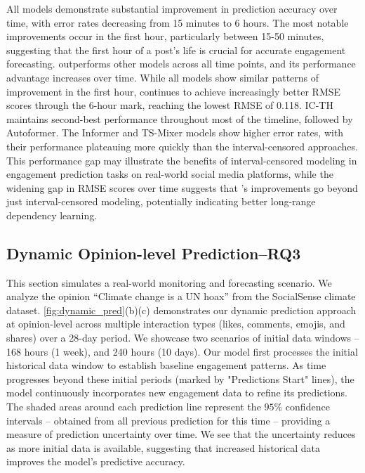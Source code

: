 All models demonstrate substantial improvement in prediction accuracy over time, with error rates decreasing from 15 minutes to 6 hours. The most notable improvements occur in the first hour, particularly between 15-50 minutes, suggesting that the first hour of a post's life is crucial for accurate engagement forecasting.
\icmamba outperforms other models across all time points, and its performance advantage increases over time. While all models show similar patterns of improvement in the first hour, \icmamba continues to achieve increasingly better RMSE scores through the 6-hour mark, reaching the lowest RMSE of 0.118. 
IC-TH maintains second-best performance throughout most of the timeline, followed by Autoformer. The Informer and TS-Mixer models show higher error rates, with their performance plateauing more quickly than the interval-censored approaches. This performance gap may illustrate the benefits of interval-censored modeling in engagement prediction tasks on real-world social media platforms, while the widening gap in RMSE scores over time suggests that \icmamba's improvements go beyond just interval-censored modeling, potentially indicating better long-range dependency learning.

\subsection{Dynamic Opinion-level Prediction--RQ3}
\label{sec:dynamic_pred}

This section simulates a real-world monitoring and forecasting scenario.
We analyze the opinion ``Climate change is a UN hoax'' from the SocialSense climate dataset. 
\cref{fig:dynamic_pred}(b)(c) demonstrates our dynamic prediction approach at opinion-level across multiple interaction types (likes, comments, emojis, and shares) over a 28-day period. We showcase two scenarios of initial data windows -- 168 hours (1 week), and 240 hours (10 days). 
Our model first processes the initial historical data window to establish baseline engagement patterns. As time progresses beyond these initial periods (marked by "Predictions Start" lines), the model continuously incorporates new engagement data to refine its predictions. The shaded areas around each prediction line represent the $95\%$ confidence intervals -- obtained from all previous prediction for this time -- providing a measure of prediction uncertainty over time.
We see that the uncertainty reduces as more initial data is available, suggesting that increased historical data improves the model's predictive accuracy. 

